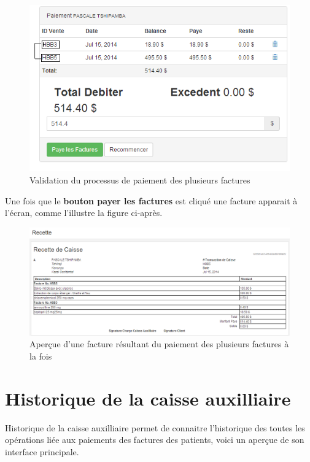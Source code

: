 \documentclass[12pt,a4paper]{report}
\begin{document}
\begin{figure}[h]
\begin{center}
\includegraphics[width=12cm]{pic/PaidDoubleFact.png}
\end{center}
\caption{Validation du processus de paiement des plusieurs factures}
\label{Validation du processus de paiement des plusieurs factures}
\end{figure}
Une fois que le \textbf{bouton payer les factures} est cliqué une facture apparait à l'écran, comme l'illustre la figure ci-après.

\begin{figure}[h]
\begin{center}
\includegraphics[width=14cm]{pic/FactureDoubles.png}
\end{center}
\caption{Aperçue d'une facture résultant du paiement des plusieurs factures à la fois}
\label{Aperçue d'une facture résultant du paiement des plusieurs factures à la fois}
\end{figure}
\newpage
\section{Historique de la caisse auxilliaire}
Historique de la caisse auxilliaire permet de connaitre l'historique des toutes les opérations liée aux paiements des factures des patients, voici un aperçue de son interface principale.
\end{document}
